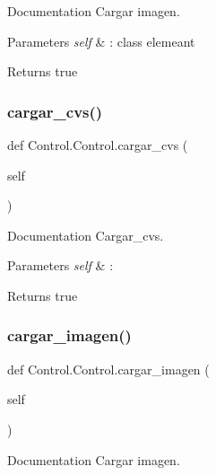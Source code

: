 Documentation Cargar imagen. 


\begin{DoxyParams}{Parameters}
{\em self} & \+: class elemeant \\
\hline
\end{DoxyParams}
\begin{DoxyReturn}{Returns}
true 
\end{DoxyReturn}
\mbox{\label{class_control_1_1_control_a22f09f13d6a7128fc4ec24d4dfb52ed5}} 
\subsubsection{\texorpdfstring{cargar\+\_\+cvs()}{cargar\_cvs()}}
{\footnotesize\ttfamily def Control.\+Control.\+cargar\+\_\+cvs (\begin{DoxyParamCaption}\item[{}]{self }\end{DoxyParamCaption})}



Documentation Cargar\+\_\+cvs. 


\begin{DoxyParams}{Parameters}
{\em self} & \+: \\
\hline
\end{DoxyParams}
\begin{DoxyReturn}{Returns}
true 
\end{DoxyReturn}
\mbox{\label{class_control_1_1_control_ab893f9803dde0fb16e273b4c718352b7}} 
\subsubsection{\texorpdfstring{cargar\+\_\+imagen()}{cargar\_imagen()}}
{\footnotesize\ttfamily def Control.\+Control.\+cargar\+\_\+imagen (\begin{DoxyParamCaption}\item[{}]{self }\end{DoxyParamCaption})}



Documentation Cargar imagen. 


